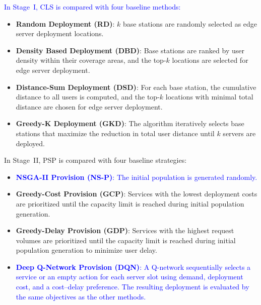\documentclass[10pt, conference, letterpaper]{IEEEtran}
\newenvironment{revision}{\begingroup\color{blue}}{\endgroup}
\newcommand{\rev}[1]{\textcolor{blue}{#1}}
\newenvironment{revision}{\begingroup}{\endgroup}
\newcommand{\rev}[1]{#1}
\begin{document}

\rev{In Stage~I, CLS is compared with four baseline methods:}
\begin{itemize}
    \item \textbf{Random Deployment (RD)}: $k$ base stations are randomly selected as edge server deployment locations.
    \item \textbf{Density Based Deployment (DBD)}: Base stations are ranked by user density within their coverage areas, and the top-$k$ locations are selected for edge server deployment.
    \item \textbf{Distance-Sum Deployment (DSD)}: For each base station, the cumulative distance to all users is computed, and the top-$k$ locations with minimal total distance are chosen for edge server deployment.
    \item \textbf{Greedy-K Deployment (GKD)}: The algorithm iteratively selects base stations that maximize the reduction in total user distance until $k$ servers are deployed.
\end{itemize}

\begin{revision}
In Stage~II, PSP is compared with four baseline strategies:
\end{revision}
\begin{itemize}
    \item \rev{\textbf{NSGA-II Provision (NS-P)}: The initial population is generated randomly.}
    \item \textbf{Greedy-Cost Provision (GCP)}: Services with the lowest deployment costs are prioritized until the capacity limit is reached during initial population generation.
    \item \textbf{Greedy-Delay Provision (GDP)}: Services with the highest request volumes are prioritized until the capacity limit is reached during initial population generation to minimize user delay.
    \item \rev{\textbf{Deep Q-Network Provision (DQN)}: A Q-network sequentially selects a service or an empty action for each server slot using demand, deployment cost, and a cost--delay preference. The resulting deployment is evaluated by the same objectives as the other methods.}
\end{itemize}
\end{document}
